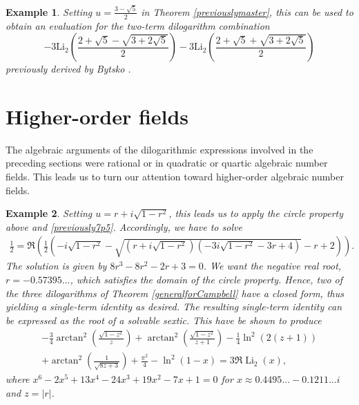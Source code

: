 \documentclass[12pt]{article}
\newtheorem{example}{Example}
\begin{document}
\begin{example}
 Setting $u = \frac{3-\sqrt{5}}{2}$ in Theorem \ref{previouslymaster}, this can be used to obtain an evaluation for the two-term 
 dilogarithm combination $$ - 3 \mathrm{Li}_2\left(\frac{2 + \sqrt{5} - \sqrt{3 + 2 \sqrt{5}}}{2} \right) - 3 \mathrm{Li}_2\left(\frac{2 + 
 \sqrt{5} + \sqrt{3 + 2 \sqrt{5}}}{2} \right) $$ previously derived by Bytsko \cite{Bytsko1999}. 
\end{example}

\section{Higher-order fields}
 The algebraic arguments of the dilogarithmic expressions involved in the preceding sections were rational or in quadratic or 
 quartic algebraic number fields. This leads us to turn our attention toward higher-order algebraic number fields. 

\begin{example}
 Setting $u = r + i\sqrt{1-r^{2}}$, this leads us to apply the circle property above and \eqref{previously7p5}. Accordingly, we have 
 to solve 
\begin{equation*}
\begin{aligned}
 \frac{1}{2} = \Re \left( \frac{1}{2} \left( -i \sqrt{1 - r^2} - 
 \sqrt{(r + i \sqrt{1 - r^2}) (-3 i \sqrt{1 - r^2} - 3r + 4)} - r + 2 \right) \right). 
\end{aligned}
\end{equation*}
 The solution is given by $8 r^3 - 8 r^2 - 2 r + 3 =0$. We want the negative real root, $r=-0.57395...$, which satisfies the domain of 
 the circle property. Hence, two of the three dilogarithms of Theorem \ref{generalforCampbell} have a closed form, thus yielding a 
 single-term identity as desired. The resulting single-term identity can be expressed as the root of a solvable sextic. This have be 
 shown to produce 
 \begin{equation*}
\begin{aligned}
 -\frac{3}{4} \arctan^{2} \left( \frac{\sqrt{1 - z^2}}{z} \right) + \arctan^{2} \left( \frac{\sqrt{1 - z^2}}{z + 1} \right) 
 - \frac{1}{4} \ln^2(2(z + 1))\\ 
 + \arctan^2 \left( \frac{1}{\sqrt{8z + 3}} \right) + \frac{\pi^2}{4} - \ln^2(1 - x) = 3\Re\operatorname{Li}_2(x), 
 \end{aligned}
\end{equation*}
 where $x^6 - 2 x^5 + 13 x^4 - 24 x^3 + 19 x^2 - 7 x + 1=0$ for $x\approx 0.4495...-0.1211...i$ and $z=|r|$. 
\end{example}
\end{document}
